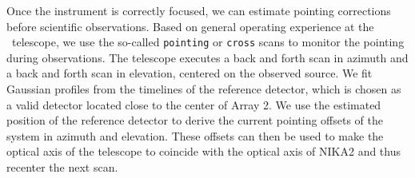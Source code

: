 Once the instrument is correctly focused, we can estimate pointing corrections
before scientific observations.
%
%
%
%
Based on general operating experience at the \trentemetre\ telescope, we use the so-called
{\tt pointing} or {\tt cross} scans to monitor the pointing during observations. The
telescope executes a back and forth scan in azimuth and a back and forth scan in
elevation, centered on the observed source. We fit Gaussian profiles
from the timelines of the reference detector, which is chosen as a
valid detector located close to the center of Array 2. We use the
estimated position of the reference detector to derive the current pointing
offsets of the system in azimuth and elevation. These offsets can then
be used to make the optical axis of the telescope to coincide with the
optical axis of NIKA2 and thus recenter the next scan.

